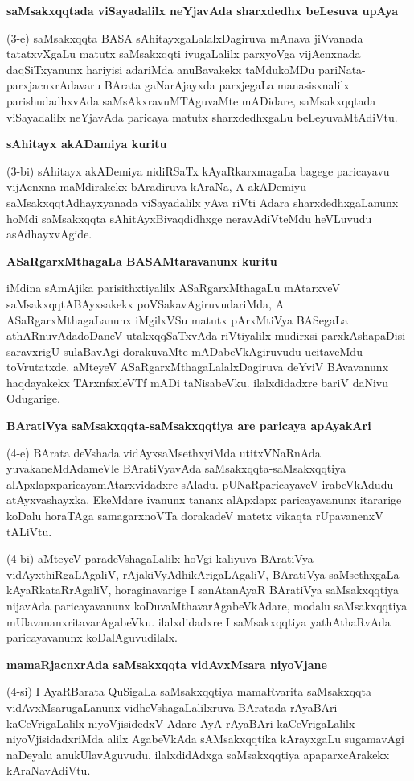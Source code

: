 \textbf{saMsakxqqtada viSayadalilx neYjavAda sharxdedhx beLesuva upAya}

(3-e) saMsakxqqta BASA sAhitayxgaLalalxDagiruva mAnava jiVvanada tatatxvXgaLu matutx saMsakxqqti ivugaLalilx parxyoVga vijAcnxnada daqSiTxyanunx hariyisi adariMda anuBavakekx taMdukoMDu pariNata-parxjacnxrAdavaru BArata gaNarAjayxda parxjegaLa manasisxnalilx parishudadhxvAda saMsAkxravuMTAguvaMte mADidare, saMsakxqqtada viSayadalilx neYjavAda paricaya matutx sharxdedhxgaLu beLeyuvaMtAdiVtu.

\textbf{sAhitayx akADamiya kuritu}

(3-bi) sAhitayx akADemiya nidiRSaTx kAyaRkarxmagaLa bagege paricayavu vijAcnxna maMdirakekx bAradiruva kAraNa, A akADemiyu saMsakxqqtAdhayxyanada viSayadalilx yAva riVti Adara sharxdedhxgaLanunx hoMdi saMsakxqqta sAhitAyxBivaqdidhxge neravAdiVteMdu heVLuvudu asAdhayxvAgide.

\textbf{ASaRgarxMthagaLa BASAMtaravanunx kuritu}

iMdina sAmAjika parisithxtiyalilx ASaRgarxMthagaLu mAtarxveV saMsakxqqtABAyxsakekx poVSakavAgiruvudariMda, A ASaRgarxMthagaLanunx iMgilxVSu matutx pArxMtiVya BASegaLa athARnuvAdadoDaneV utakxqqSaTxvAda riVtiyalilx mudirxsi parxkAshapaDisi saravxrigU sulaBavAgi dorakuvaMte mADabeVkAgiruvudu ucitaveMdu toVrutatxde. aMteyeV ASaRgarxMthagaLalalxDagiruva deYviV BAvavanunx haqdayakekx TArxnfsxleVTf mADi taNisabeVku. ilalxdidadxre bariV daNivu Odugarige. 

\textbf{BAratiVya saMsakxqqta-saMsakxqqtiya are paricaya apAyakAri}

(4-e) BArata deVshada vidAyxsaMsethxyiMda utitxVNaRnAda yuvakaneMdAdameVle BAratiVyavAda saMsakxqqta-saMsakxqqtiya alApxlapxparicayamAtarxvidadxre sAladu. pUNaRparicayaveV irabeVkAdudu atAyxvashayxka. EkeMdare ivanunx tananx alApxlapx paricayavanunx itararige koDalu horaTAga samagarxnoVTa dorakadeV matetx vikaqta rUpavanenxV tALiVtu.

(4-bi) aMteyeV paradeVshagaLalilx hoVgi kaliyuva BAratiVya vidAyxthiRgaLAgaliV, rAjakiVyAdhikArigaLAgaliV, BAratiVya saMsethxgaLa kAyaRkataRrAgaliV, horaginavarige I sanAtanAyaR BAratiVya saMsakxqqtiya nijavAda paricayavanunx koDuvaMthavarAgabeVkAdare, modalu saMsakxqqtiya mUlavananxritavarAgabeVku. ilalxdidadxre I saMsakxqqtiya yathAthaRvAda paricayavanunx koDalAguvudilalx.

\textbf{mamaRjacnxrAda saMsakxqqta vidAvxMsara niyoVjane}

(4-si) I AyaRBarata QuSigaLa saMsakxqqtiya mamaRvarita saMsakxqqta vidAvxMsarugaLanunx vidheVshagaLalilxruva BAratada rAyaBAri kaCeVrigaLalilx niyoVjisidedxV Adare AyA rAyaBAri kaCeVrigaLalilx niyoVjisidadxriMda alilx AgabeVkAda sAMsakxqqtika kArayxgaLu sugamavAgi naDeyalu anukUlavAguvudu. ilalxdidAdxga saMsakxqqtiya apaparxcArakekx kAraNavAdiVtu.

